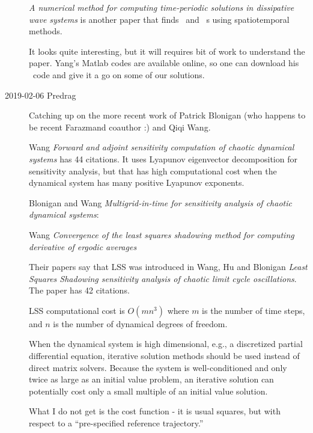 \begin{description}
 {
 {\em A numerical method for computing time-periodic solutions
in dissipative wave systems} is another paper that finds \KS\ and \cGL\ {\rpo}s
using spatiotemporal methods.

It looks quite interesting, but it will requires bit of work to understand the
paper. Yang's Matlab codes are available
 {online}, so one can download
his \KS\ code and give it a go on some of our solutions.
    }

\item[2019-02-06 Predrag]
Catching up on the more recent work of
{Patrick Blonigan} (who happens to be recent Farazmand coauthor :)
and
{Qiqi Wang}.

Wang
{\em Forward and adjoint sensitivity computation of chaotic dynamical systems}
has 44 citations.
It uses Lyapunov eigenvector decomposition for sensitivity analysis, but
that has high computational cost when the dynamical system has many
positive Lyapunov exponents.

Blonigan and Wang
{\em Multigrid-in-time for sensitivity analysis of chaotic dynamical systems}:

Wang {\em Convergence of the least squares shadowing method for
computing derivative of ergodic averages}

Their papers say that LSS was introduced in
Wang, Hu and Blonigan {\em {Least Squares Shadowing} sensitivity
analysis of chaotic limit cycle oscillations}. The paper has 42 citations.

LSS computational cost is $O(mn^3)$ where $m$ is the number of time steps, and
$n$ is the number of dynamical degrees of freedom.

When the dynamical system is high dimensional, e.g., a discretized
partial differential equation, iterative solution methods should be used
instead of direct matrix solvers. Because the system is well-conditioned
and only twice as large as an initial value problem, an iterative
solution can potentially cost only a small multiple of an initial value
solution.

What I do not get is
the cost function - it is usual squares, but with respect to a
``pre-specified reference trajectory.''


\end{description}
